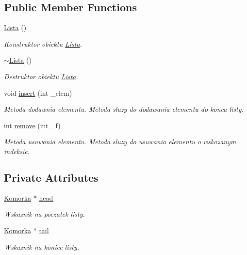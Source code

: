 \subsection*{Public Member Functions}
\begin{DoxyCompactItemize}
\item 
\hyperlink{class_lista_a1f668b36909182ef1360b48503529a31}{Lista} ()
\begin{DoxyCompactList}\small\item\em Konstruktor obiektu \hyperlink{class_lista}{Lista}. \end{DoxyCompactList}\item 
\hyperlink{class_lista_a4d7394b2728a00ad8404965b2e15d096}{$\sim$\-Lista} ()
\begin{DoxyCompactList}\small\item\em Destruktor obiektu \hyperlink{class_lista}{Lista}. \end{DoxyCompactList}\item 
void \hyperlink{class_lista_acec8ac807da644d8250c3c6043a208e1}{insert} (int \-\_\-elem)
\begin{DoxyCompactList}\small\item\em Metoda dodawnia elementu. Metoda sluzy do dodawania elementu do konca listy. \end{DoxyCompactList}\item 
int \hyperlink{class_lista_a18ce18bccb1af9b8d818f103021d7b4a}{remove} (int \-\_\-f)
\begin{DoxyCompactList}\small\item\em Metoda usuwania elementu. Metoda sluzy do usuwania elementu o wskazanym indeksie. \end{DoxyCompactList}\end{DoxyCompactItemize}
\subsection*{Private Attributes}
\begin{DoxyCompactItemize}
\item 
\hyperlink{struct_lista_1_1_komorka}{Komorka} $\ast$ \hyperlink{class_lista_aeba20505030183d334971bd44c3c8b95}{head}
\begin{DoxyCompactList}\small\item\em Wskaznik na poczatek listy. \end{DoxyCompactList}\item 
\hyperlink{struct_lista_1_1_komorka}{Komorka} $\ast$ \hyperlink{class_lista_a7d42e5f99e945d97c29d6f764f71f4e7}{tail}
\begin{DoxyCompactList}\small\item\em Wskaznik na koniec listy. \end{DoxyCompactList}\end{DoxyCompactItemize}


